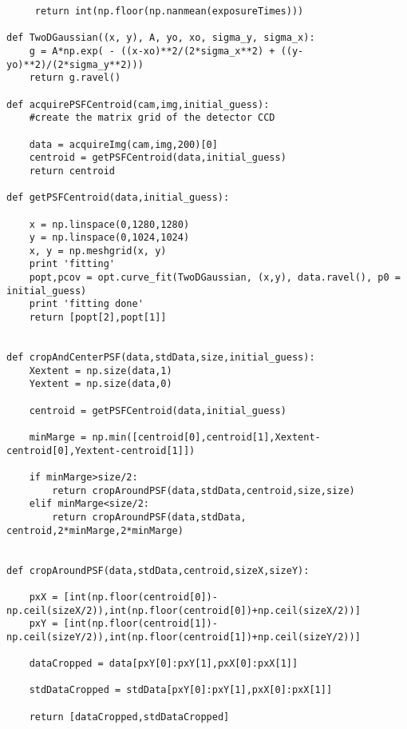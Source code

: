 \begin{lstlisting}
     return int(np.floor(np.nanmean(exposureTimes)))

def TwoDGaussian((x, y), A, yo, xo, sigma_y, sigma_x):
    g = A*np.exp( - ((x-xo)**2/(2*sigma_x**2) + ((y-yo)**2)/(2*sigma_y**2)))
    return g.ravel()

def acquirePSFCentroid(cam,img,initial_guess):
    #create the matrix grid of the detector CCD

    data = acquireImg(cam,img,200)[0]
    centroid = getPSFCentroid(data,initial_guess)
    return centroid

def getPSFCentroid(data,initial_guess):
    
    x = np.linspace(0,1280,1280)
    y = np.linspace(0,1024,1024)
    x, y = np.meshgrid(x, y)
    print 'fitting'
    popt,pcov = opt.curve_fit(TwoDGaussian, (x,y), data.ravel(), p0 = initial_guess)
    print 'fitting done'
    return [popt[2],popt[1]]


def cropAndCenterPSF(data,stdData,size,initial_guess):
    Xextent = np.size(data,1)
    Yextent = np.size(data,0)

    centroid = getPSFCentroid(data,initial_guess)

    minMarge = np.min([centroid[0],centroid[1],Xextent-centroid[0],Yextent-centroid[1]])

    if minMarge>size/2:
        return cropAroundPSF(data,stdData,centroid,size,size)
    elif minMarge<size/2:
        return cropAroundPSF(data,stdData, centroid,2*minMarge,2*minMarge)


def cropAroundPSF(data,stdData,centroid,sizeX,sizeY):

    pxX = [int(np.floor(centroid[0])-np.ceil(sizeX/2)),int(np.floor(centroid[0])+np.ceil(sizeX/2))]
    pxY = [int(np.floor(centroid[1])-np.ceil(sizeY/2)),int(np.floor(centroid[1])+np.ceil(sizeY/2))]

    dataCropped = data[pxY[0]:pxY[1],pxX[0]:pxX[1]]

    stdDataCropped = stdData[pxY[0]:pxY[1],pxX[0]:pxX[1]]

    return [dataCropped,stdDataCropped]

\end{lstlisting}